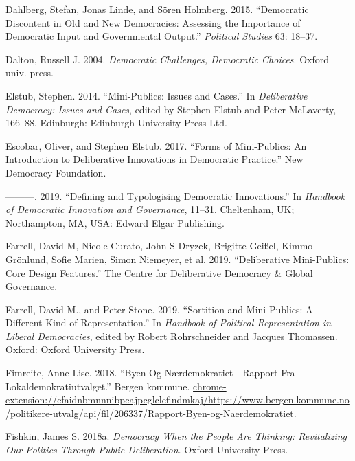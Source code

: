 \documentclass[
  12pt,
  a4paper, 12pt]{article}
\newlength{\cslhangindent}
\newlength{\cslentryspacingunit} %
\newenvironment{CSLReferences}[2] %
 {%
  \setlength{\parindent}{0pt}
  \ifodd #1
  \let\oldpar\par
  \def\par{\hangindent=\cslhangindent\oldpar}
  \fi
  \setlength{\parskip}{#2\cslentryspacingunit}
 }%
 {}
\begin{document}
\begin{CSLReferences}{1}{0}
\leavevmode{}%
Dahlberg, Stefan, Jonas Linde, and Sören Holmberg. 2015. {``Democratic Discontent in Old and New Democracies: Assessing the Importance of Democratic Input and Governmental Output.''} \emph{Political Studies} 63: 18--37.

\leavevmode{}%
Dalton, Russell J. 2004. \emph{Democratic Challenges, Democratic Choices}. Oxford univ. press.

\leavevmode{}%
Elstub, Stephen. 2014. {``Mini-Publics: {Issues} and Cases.''} In \emph{Deliberative {Democracy}: {Issues} and {Cases}}, edited by Stephen Elstub and Peter McLaverty, 166--88. Edinburgh: Edinburgh University Press Ltd.

\leavevmode{}%
Escobar, Oliver, and Stephen Elstub. 2017. {``Forms of {Mini}-Publics: {An} Introduction to Deliberative Innovations in Democratic Practice.''} New Democracy Foundation.

\leavevmode{}%
---------. 2019. {``Defining and Typologising Democratic Innovations.''} In \emph{Handbook of {Democratic} {Innovation} and {Governance}}, 11--31. Cheltenham, UK; Northampton, MA, USA: Edward Elgar Publishing.

\leavevmode{}%
Farrell, David M, Nicole Curato, John S Dryzek, Brigitte Geißel, Kimmo Grönlund, Sofie Marien, Simon Niemeyer, et al. 2019. {``Deliberative {Mini}-{Publics}: {Core} {Design} {Features}.''} The Centre for Deliberative Democracy \& Global Governance.

\leavevmode{}%
Farrell, David M., and Peter Stone. 2019. {``Sortition and {Mini}-{Publics}: {A} {Different} {Kind} of {Representation}.''} In \emph{Handbook of {Political} {Representation} in {Liberal} {Democracies}}, edited by Robert Rohrschneider and Jacques Thomassen. Oxford: Oxford University Press.

\leavevmode{}%
Fimreite, Anne Lise. 2018. {``Byen Og Nærdemokratiet - Rapport Fra Lokaldemokratiutvalget.''} Bergen kommune. \url{chrome-extension://efaidnbmnnnibpcajpcglclefindmkaj/https://www.bergen.kommune.no/politikere-utvalg/api/fil/206337/Rapport-Byen-og-Naerdemokratiet}.

\leavevmode{}%
Fishkin, James S. 2018a. \emph{Democracy When the People Are Thinking: Revitalizing Our Politics Through Public Deliberation}. Oxford University Press.


\end{CSLReferences}
\end{document}
